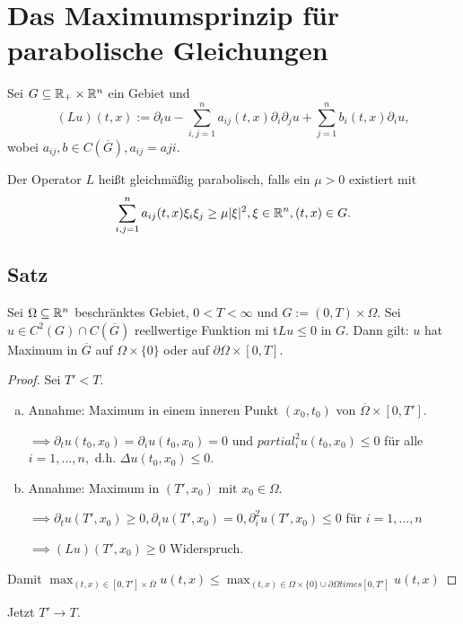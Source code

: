 \section{Das Maximumsprinzip für parabolische Gleichungen}

Sei $G \subseteq \mathbb{R}_+ \times \mathbb{R}^n$ ein Gebiet und
$$
(Lu)(t,x) := \partial_t u - \sum_{i, j = 1}^n a_{ij}(t,x) \partial_i \partial_j u + \sum_{j = 1}^n b_i(t,x) \partial_i u,
$$
wobei $a_{ij}, b \in C(\overline G), a_{ij} = a{ji}$.

Der Operator $L$ heißt gleichmäßig parabolisch, falls ein $\mu > 0$ existiert mit
$$
\sum_{i,j = 1}^n a_{ij}(t,x) \xi_i \xi_j \geq \mu |\xi|^2, \xi \in \mathbb{R}^n, (t,x) \in G.
$$

\subsection{Satz}

Sei $\Omega \subseteq \mathbb{R}^n$ beschränktes Gebiet, $0 < T < \infty$  und $G := (0, T) \times \Omega$. Sei $u \in C^2(G) \cap C(\overline G)$ reellwertige Funktion mi t$Lu \leq 0$ in $G$.
Dann gilt: $u$ hat Maximum in $\overline G$ auf $\Omega \times \{0\}$ oder auf $\partial \Omega \times [0,T]$.

\begin{proof}
  Sei $T' < T$.

  \begin{enumerate}[a)]
    \item Annahme: Maximum in einem inneren Punkt $(x_0, t_0)$ von $\overline \Omega \times [0,T']$.

      $\implies \partial_t u(t_0, x_0) = \partial_i u(t_0, x_0) = 0$ und $partial_i^2 u(t_0, x_0) \leq 0$ für alle $i = 1, \dots, n, $ d.h. $\Delta u(t_0, x_0) \leq 0$.

    \item Annahme: Maximum in $(T', x_0)$ mit $x_0 \in \Omega$.

      $\implies \partial_t u(T', x_0) \geq 0, \partial_i u(T', x_0) = 0, \partial_i^2 u(T', x_0) \leq 0$ für $i = 1, \dots, n$

      $\implies (Lu)(T', x_0) \geq 0$ Widerspruch. 
  \end{enumerate}

  Damit $\max_{(t,x) \in [0,T'] \times \overline \Omega} u(t,x) \leq \max_{(t,x) \in \Omega \times \{0\} \cup \partial \Omega times [0, T']} u(t,x)$
\end{proof}

Jetzt $T' \to T$.

